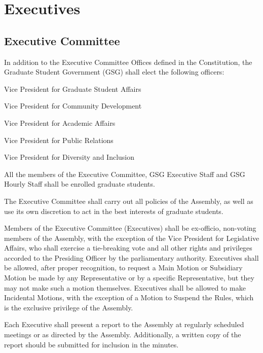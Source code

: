 \chapter{Executives}

\section{Executive Committee}
\begin{bylaws-number}
  \item In addition to the Executive Committee Offices defined in the Constitution, the Graduate Student Government (GSG) shall elect the following officers:
  \begin{bylaws-number}
    \item Vice President for Graduate Student Affairs
    \item Vice President for Community Development
    \item Vice President for Academic Affairs
    \item Vice President for Public Relations
    \item Vice President for Diversity and Inclusion
  \end{bylaws-number}
  \item All the members of the Executive Committee, GSG Executive Staff and GSG Hourly Staff shall be enrolled graduate students.
  \item The Executive Committee shall carry out all policies of the Assembly, as well as use its own discretion to act in the best interests of graduate students.
  \item Members of the Executive Committee (Executives) shall be ex-officio, non-voting members of the Assembly, with the exception of the Vice President for Legislative Affairs, who shall exercise a tie-breaking vote and all other rights and privileges accorded to the Presiding Officer by the parliamentary authority. Executives shall be allowed, after proper recognition, to request a Main Motion or Subsidiary Motion be made by any Representative or by a specific Representative, but they may not make such a motion themselves. Executives shall be allowed to make Incidental Motions, with the exception of a Motion to Suspend the Rules, which is the exclusive privilege of the Assembly.
  \item Each Executive shall present a report to the Assembly at regularly scheduled meetings or as directed by the Assembly. Additionally, a written copy of the report should be submitted for inclusion in the minutes.

\end{bylaws-number}
